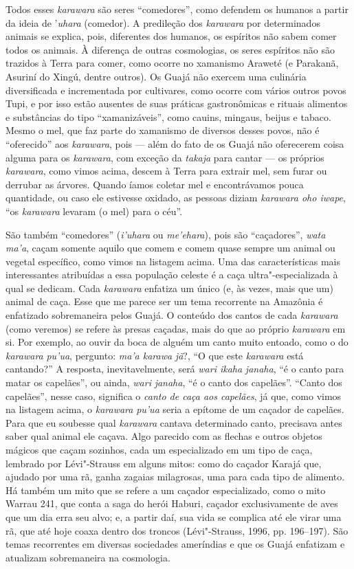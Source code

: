 Todos esses \emph{karawara} são seres ``comedores'', como defendem os
humanos a partir da ideia de '\emph{uhara} (comedor). A predileção dos
\emph{karawara} por determinados animais se explica, pois, diferentes
dos humanos, os espíritos não sabem comer todos os animais. À diferença
de outras cosmologias, os seres espíritos não são trazidos à Terra para
comer, como ocorre no xamanismo Araweté (e Parakanã, Asuriní do Xingú,
dentre outros). Os Guajá não exercem uma culinária diversificada e
incrementada por cultivares, como ocorre com vários outros povos Tupi, e
por isso estão ausentes de suas práticas gastronômicas e rituais
alimentos e substâncias do tipo ``xamanizáveis'', como cauins, mingaus,
beijus e tabaco. Mesmo o mel, que faz parte do xamanismo de diversos
desses povos, não é ``oferecido'' aos \emph{karawara}, pois --- além do fato
de os Guajá não oferecerem coisa alguma para os \emph{karawara}, com
exceção da \emph{takaja} para cantar --- os próprios \emph{karawara}, como
vimos acima, descem à Terra para extrair mel, sem furar ou derrubar as
árvores. Quando íamos coletar mel e encontrávamos pouca quantidade, ou
caso ele estivesse oxidado, as pessoas diziam \emph{karawara oho iwape},
``os \emph{karawara} levaram (o mel) para o céu''.

São também ``comedores'' (\emph{i'uhara} ou \emph{me'ehara}), pois são
``caçadores'', \emph{wata ma'a}, caçam somente aquilo que comem e comem
quase sempre um animal ou vegetal específico, como vimos na listagem
acima. Uma das características mais interessantes atribuídas a essa
população celeste é a caça ultra"-especializada à qual se dedicam. Cada
\emph{karawara} enfatiza um único (e, às vezes, mais que um) animal de
caça. Esse que me parece ser um tema recorrente na Amazônia é enfatizado
sobremaneira pelos Guajá. O conteúdo dos cantos de cada \emph{karawara}
(como veremos) se refere às presas caçadas, mais do que ao próprio
\emph{karawara} em si. Por exemplo, ao ouvir da boca de alguém um canto
muito entoado, como o do \emph{karawara} \emph{pu'ua}, pergunto:
\emph{ma'a karawa} \emph{jã}?, ``O que este \emph{karawara} está
cantando?'' A resposta, inevitavelmente, será \emph{wari ikaha}
\emph{janaha}, ``é o canto para matar os capelães'', ou ainda, \emph{wari}
\emph{janaha}, ``é o canto dos capelães''. ``Canto dos capelães'', nesse
caso, significa o \emph{canto de caça aos capelães}, já que, como vimos
na listagem acima, o \emph{karawara} \emph{pu'ua} seria a epítome de um
caçador de capelães. Para que eu soubesse qual \emph{karawara} cantava
determinado canto, precisava antes saber qual animal ele caçava. Algo
parecido com as flechas e outros objetos mágicos que caçam sozinhos,
cada um especializado em um tipo de caça, lembrado por Lévi"-Strauss em
alguns mitos: como do caçador Karajá que, ajudado por uma rã, ganha
zagaias milagrosas, uma para cada tipo de alimento. Há também um mito
que se refere a um caçador especializado, como o mito Warrau 241, que
conta a saga do herói Haburi, caçador exclusivamente de aves que um dia
erra seu alvo; e, a partir daí, sua vida se complica até ele virar uma
rã, que até hoje coaxa dentro dos troncos (Lévi"-Strauss, 1996, pp.
196--197). São temas recorrentes em diversas sociedades ameríndias e que
os Guajá enfatizam e atualizam sobremaneira na cosmologia.

